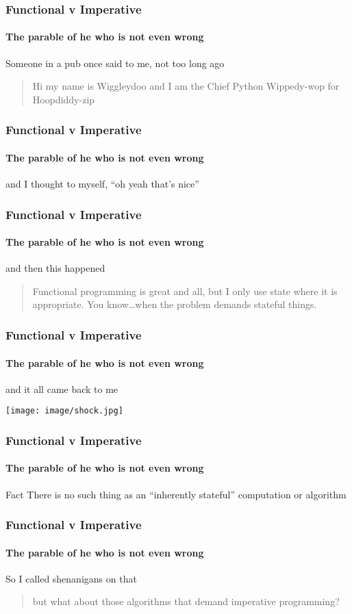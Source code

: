 {

\begin{frame}
\frametitle{Functional v Imperative}
\framesubtitle{The parable of he who is not even wrong}
Someone in a pub once said to me, not too long ago
\begin{quote}
Hi my name is Wiggleydoo and I am the Chief Python Wippedy-wop for Hoopdiddy-zip
\end{quote}
\end{frame}


\begin{frame}
\frametitle{Functional v Imperative}
\framesubtitle{The parable of he who is not even wrong}
and I thought to myself, ``oh yeah that's nice''
\end{frame}


\begin{frame}
\frametitle{Functional v Imperative}
\framesubtitle{The parable of he who is not even wrong}
and then this happened
\begin{quote}
Functional programming is great and all, but I only use state where it is appropriate. You know\ldots when the problem demands stateful things.
\end{quote}
\end{frame}


\begin{frame}
\frametitle{Functional v Imperative}
\framesubtitle{The parable of he who is not even wrong}
\begin{center}
and it all came back to me
\end{center}
\begin{center}
\texttt{[image: image/shock.jpg]}
\end{center}
\end{frame}


\begin{frame}
\frametitle{Functional v Imperative}
\framesubtitle{The parable of he who is not even wrong}
\begin{block}{Fact}
There is no such thing as an ``inherently stateful'' computation or algorithm
\end{block}
\end{frame}


\begin{frame}
\frametitle{Functional v Imperative}
\framesubtitle{The parable of he who is not even wrong}
\begin{block}{So I called shenanigans on that}
\begin{quote}
but what about those algorithms that demand imperative programming?
\end{quote}
\end{block}
\end{frame}


}
